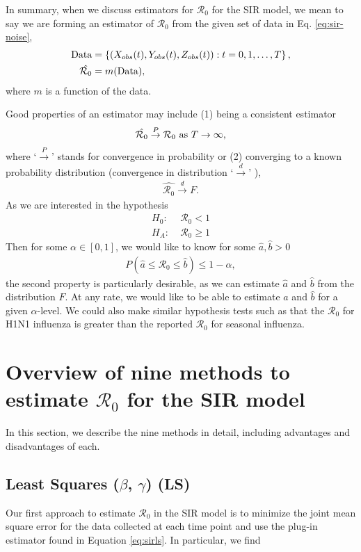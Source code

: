 \documentclass[12pt]{article}
\newcommand{\wxxsir}{nine } %
\newcommand{\rr}{\ensuremath{\mathcal{R}_0}}
\begin{document}
In summary, when we discuss estimators for $\rr$ for the SIR model, we mean to say we are forming an estimator of $\rr$ from the given set of data in Eq. \ref{eq:sir-noise},
\begin{align*}
  \textnormal{Data} &= \left \{\left (X_{obs}(t), Y_{obs}(t), Z_{obs}(t) \right ) : t=0, 1, \dots, T\right \}, \\
  \hat{\rr} &= m(\textnormal{Data}),
\end{align*}
where $m$ is a function of the data.

Good properties of an estimator may include (1) being a consistent estimator
\begin{align*}
  \hat{\rr} \overset{P}{\to} \rr \textnormal{ as } T\to \infty,
\end{align*}
where `$\overset{P}{\to}$' stands for convergence in probability \citep{wasserman2004} or (2) converging to a known probability distribution (convergence in distribution `$\overset{d}{\to}$' \citep{wasserman2004}),
\begin{align*}
\hat{\rr} \overset{d}{\to} F.  
\end{align*}
As we are interested in the hypothesis
\begin{align*}
  H_0:\;& \rr < 1 \\
  H_A:\;& \rr \ge 1
\end{align*}
Then for some $\alpha \in [0,1]$, we would like to know for some $\hat{a}, \hat{b} >0$
\begin{align*}
P(\hat{a} \le \rr \le \hat{b}) \le 1 - \alpha,  
\end{align*}
the second property is particularly desirable, as we can estimate $\hat{a}$ and $\hat{b}$ from the distribution $F$.  At any rate, we would like to be able to estimate $\hat{a}$ and $\hat{b}$ for a given $\alpha$-level.  We could also make similar hypothesis tests such as that the $\rr$ for H1N1 influenza is greater than the reported $\rr$ for seasonal influenza.

\section{Overview of \wxxsir methods to estimate $\rr$ for the SIR model}
\label{sec:methods} 

In this section, we describe the \wxxsir methods in detail, including advantages and disadvantages of each.

\subsection{Least Squares ($\beta$, $\gamma$) (LS)}\label{least-squares-beta-gamma}
Our first approach to estimate $\rr$ in the SIR model is to minimize the joint mean square error for the data collected at each time point and use the plug-in estimator found in Equation \ref{eq:sirls}.  In particular, we find
\end{document}
